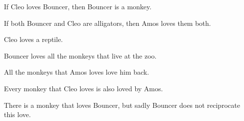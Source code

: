 \begin{compactlist}
\item If Cleo loves Bouncer, then Bouncer is a monkey.
\item[] 
\item If both Bouncer and Cleo are alligators, then Amos loves them both.
\item[] 
\item Cleo loves a reptile.
\item[] 
\item Bouncer loves all the monkeys that live at the zoo.
\item[] \item All the monkeys that Amos loves love him back.
\item[] 
\item Every monkey that Cleo loves is also loved by Amos.
\item[] 
\item There is a monkey that loves Bouncer, but sadly Bouncer does not reciprocate this love.
\item[] 
\end{compactlist}

